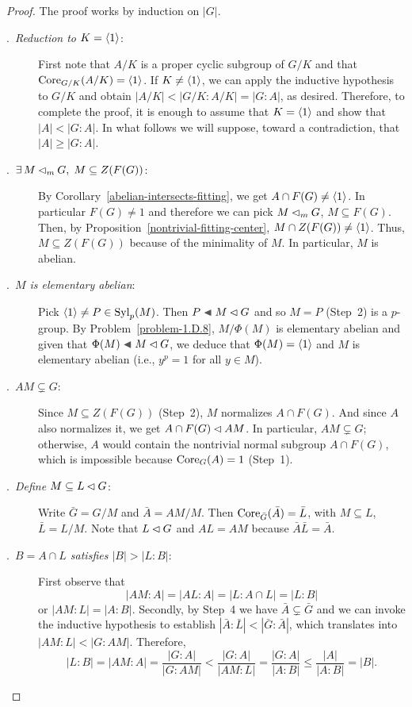 \begin{proof} The proof works by induction on $|G|$.

\begin{description}
    
    \item[.~\textit{Reduction to $K=\langle1\rangle$\/}:] First note that $A/K$ is a proper cyclic subgroup of $G/K$ and that ${\rm Core}_{G/K}(A/K)=\langle1\rangle$. If $K\ne\langle1\rangle$, we can apply the inductive hypothesis to $G/K$ and obtain $|A/K|<|G/K:A/K|=|G:A|$, as desired. Therefore, to complete the proof, it is enough to assume that $K=\langle1\rangle$ and show that $|A|<|G:A|$. In what follows we will suppose, toward a contradiction, that $|A|\ge|G:A|$.

    \item[.~\textit{$\exists\,M\lhd_mG,\; M\subseteq Z(F(G))$\/}:] By Corollary~\ref{abelian-intersects-fitting}, we get $A\cap F(G)\ne\langle1\rangle$. In particular $F(G)\ne1$ and therefore we can pick $M\lhd_m G$, $M\subseteq F(G)$. Then, by Proposition~\ref{nontrivial-fitting-center}, $M\cap Z(F(G))\ne\langle1\rangle$. Thus, $M\subseteq Z(F(G))$ because of the minimality of $M$. In particular, $M$ is abelian.

    \item[.~\textit{$M$ is elementary abelian\/}:] Pick $\langle1\rangle\ne P\in{\rm Syl}_p(M)$. Then $P\ch M\normal G$ and so $M=P$ (Step~2) is a $p$-group. By Problem~\ref{problem-1.D.8}, $M/\Phi(M)$ is elementary abelian and given that $\Phi(M)\ch M\normal G$, we deduce that $\Phi(M)=\langle1\rangle$ and $M$ is elementary abelian (i.e., $y^p=1$ for all $y\in M$).

    \item[.~\textit{$AM\varsubsetneq G$\/}:] Since $M\subseteq Z(F(G))$ (Step~2), $M$ normalizes $A\cap F(G)$. And since $A$ also normalizes it, we get $A\cap F(G)\lhd AM$. In particular, $AM\varsubsetneq G$; otherwise, $A$ would contain the nontrivial normal subgroup $A\cap F(G)$, which is impossible because ${\rm Core}_G(A)=1$ (Step~1).

    \item[.~\textit{Define $M\subseteq L\lhd G$\/}:] Write $\bar G=G/M$ and $\bar A=AM/M$. Then ${\rm Core}_{\bar G}(\bar A)=\bar L$, with $M\subseteq L$, $\bar L=L/M$. Note that $L\lhd G$ and $AL=AM$ because $\bar A\bar L=\bar A$.

    \item[.~\textit{$B=A\cap L$ satisfies $|B|>|L:B|$\/}:] First observe that
    $$
        |AM:A|=|AL:A|=|L:A\cap L|=|L:B|
    $$
    or $|AM:L|=|A:B|$. Secondly, by Step~4 we have $\bar A\varsubsetneq\bar G$ and we can invoke the inductive hypothesis to establish $|\bar A:\bar L|<|\bar G:\bar A|$, which translates into $|AM:L|<|G:AM|$. Therefore,
    $$
        |L:B|=|AM:A|=\frac{|G:A|}{|G:AM|}<\frac{|G:A|}{|AM:L|}
            =\frac{|G:A|}{|A:B|}\le\frac{|A|}{|A:B|}=|B|.
    $$


\end{description}
\end{proof}
